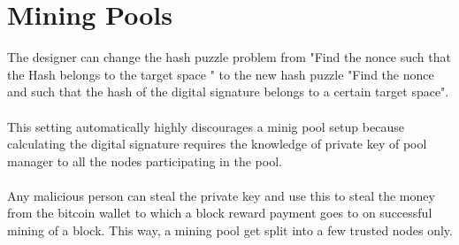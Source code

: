 \section{Mining Pools}
The designer can change the hash puzzle problem from "Find the nonce such that the Hash belongs to the target space " to the new hash puzzle "Find the nonce and such that the hash of the digital signature belongs to a certain target space".  \\  \\
This setting automatically highly discourages a minig pool setup because calculating the digital signature requires the knowledge of private key of pool manager to all the nodes participating in the pool. 
\\ \\
Any malicious person can steal the private key and use this to steal the money from the bitcoin wallet to which a block reward payment goes to on successful mining of a block. This way, a mining pool get split into a few trusted nodes only.

